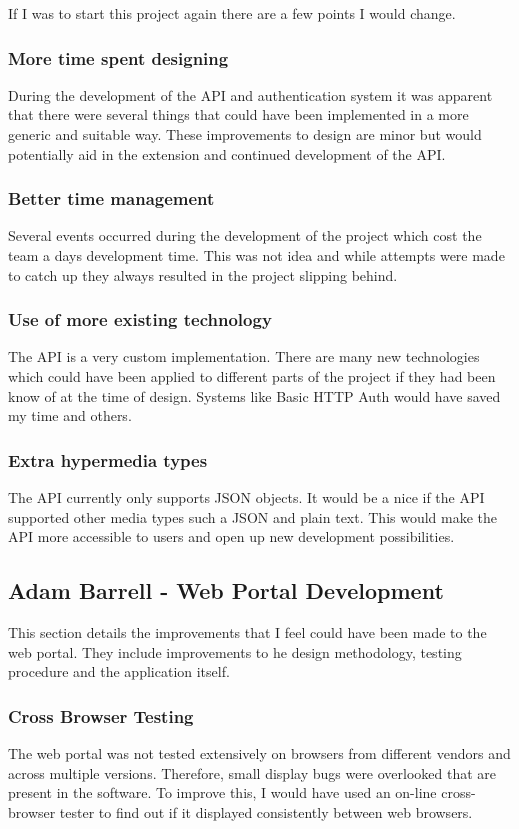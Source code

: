\documentclass[11pt,a4paper]{report}
\begin{document}
If I was to start this project again there are a few points I would change. 

\subsubsection{More time spent designing}
During the development of the API and authentication system it was apparent that there were several things that could have been implemented in a more generic and suitable way. These improvements to design are minor but would potentially aid in the extension and continued development of the API. 

\subsubsection{Better time management}
Several events occurred during the development of the project which cost the team a days development time. This was not idea and while attempts were made to catch up they always resulted in the project slipping behind.

\subsubsection{Use of more existing technology}
The API is a very custom implementation. There are many new technologies which could have been applied to different parts of the project if they had been know of at the time of design. Systems like Basic HTTP Auth would have saved my time and others. 

\subsubsection{Extra hypermedia types}
The API currently only supports JSON objects. It  would be a nice if the API supported other media types such a JSON and plain text. This would make the API more accessible to users and open up new development possibilities. 

\subsection{Adam Barrell - Web Portal Development}
This section details the improvements that I feel could have been made to the web portal. They include improvements to he design methodology, testing procedure and the application itself.

\subsubsection{Cross Browser Testing}
The web portal was not tested extensively on browsers from different vendors and across multiple versions. Therefore, small display bugs were overlooked that are present in the software. To improve this, I would have used an on-line cross-browser tester to find out if it displayed consistently between web browsers.
\end{document}
